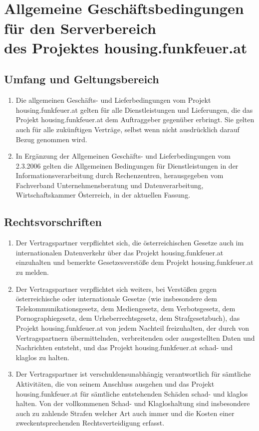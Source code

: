 \documentclass[parskip=half]{article}
\begin{document}
\thispagestyle{fancy}
\section*{\\Allgemeine Geschäftsbedingungen für den Serverbereich \\ des
Projektes housing.funkfeuer.at}

\subsection{Umfang und Geltungsbereich}
\begin{enumerate}
\item Die allgemeinen Geschäfts- und Lieferbedingungen vom Projekt
housing.funkfeuer.at gelten für alle Dienstleistungen und Lieferungen, die das
Projekt housing.funkfeuer.at dem Auftraggeber gegenüber erbringt. Sie gelten
auch für alle zukünftigen Verträge, selbst wenn nicht ausdrücklich darauf
Bezug genommen wird.
\item In Ergänzung der Allgemeinen Geschäfts- und Lieferbedingungen vom
2.3.2006 gelten die Allgemeinen Bedingungen für Dienstleistungen in der
Informationsverarbeitung durch Rechenzentren, herausgegeben vom Fachverband
Unternehmensberatung und Datenverarbeitung, Wirtschaftskammer Österreich,
in der aktuellen Fassung.
\end{enumerate}

\subsection{Rechtsvorschriften}
\begin{enumerate}
\item Der Vertragspartner verpflichtet sich, die österreichischen Gesetze auch im
internationalen Datenverkehr über das Projekt housing.funkfeuer.at einzuhalten und
bemerkte Gesetzesverstöße dem Projekt housing.funkfeuer.at zu melden.
\item Der Vertragspartner verpflichtet sich weiters, bei Verstößen gegen österreichische
oder internationale Gesetze (wie insbesondere dem Telekommunikationsgesetz, dem
Mediengesetz, dem Verbotsgesetz, dem Pornographiegesetz, dem Urheberrechtsgesetz,
dem Strafgesetzbuch), das Projekt housing.funkfeuer.at von jedem Nachteil freizuhalten,
der durch von Vertragspartnern übermittelnden, verbreitenden oder ausgestellten Daten
und Nachrichten entsteht, und das Projekt housing.funkfeuer.at schad- und klaglos zu
halten.
\item Der Vertragspartner ist verschuldensunabhängig verantwortlich für sämtliche
Aktivitäten, die von seinem Anschluss ausgehen und das Projekt housing.funkfeuer.at für
sämtliche entstehenden Schäden schad- und klaglos halten. Von der vollkommenen Schad- und
Klagloshaltung sind insbesondere auch zu zahlende Strafen welcher Art auch immer und die
Kosten einer zweckentsprechenden Rechtsverteidigung erfasst.
\end{enumerate}
\end{document}
